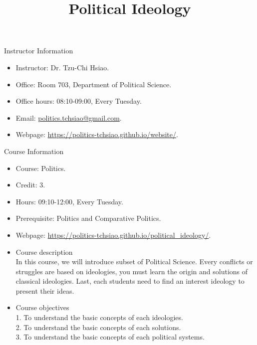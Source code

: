 \documentclass{article}
\title{\fontsize{16pt}{16pt}\selectfont Political Ideology}
\author{}
\date{}
\begin{document}
\maketitle
\fontsize{14pt}{14pt}\selectfont
\begin{flushleft}
Instructor Information
\end{flushleft}
\begin{itemize}
\item Instructor: Dr. Tzu-Chi Hsiao. \\
\item Office: Room 703, Department of Political Science. \\
\item Office hours: 08:10-09:00, Every Tuesday. \\
\item Email: \href{mailto:politics.tchsiao@gmail.com}{politics.tchsiao@gmail.com}. \\
\item Webpage: \href{https://politics-tchsiao.github.io/website/}{https://politics-tchsiao.github.io/website/}. \\
\end{itemize}
Course Information \\
\begin{itemize}
\item Course: Politics. \\
\item Credit: 3. \\
\item Hours: 09:10-12:00, Every Tuesday. \\
\item Prerequisite: Politics and Comparative Politics. \\
\item Webpage: \href{https://politics-tchsiao.github.io/political_ideology/}{https://politics-tchsiao.github.io/political\_ideology/}. \\
\item Course description \\
In this course, we will introduce subset of Political Science. Every conflicts or struggles are based on ideologies, you must learn the origin and solutions of classical ideologies. Last, each students need to find an interest ideology to present their ideas. \\ 
\item Course objectives \\
1. To understand the basic concepts of each ideologies. \\
2. To understand the basic concepts of each solutions. \\
3. To understand the basic concepts of each political systems. \\
\end{itemize}
\end{document}
